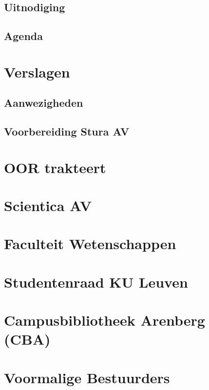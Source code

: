 \documentclass[a4paper,11pt]{article}
\begin{document}
	\subsection{Uitnodiging}
	
	\subsection{Agenda}
	
	\section{Verslagen}
	
	\subsection{Aanwezigheden}
	
	\subsection{Voorbereiding Stura AV}
	
	\section{OOR trakteert}
	
	\section{Scientica AV}
	
	\section{Faculteit Wetenschappen}
	
	\section{Studentenraad KU Leuven}
	\label{stura}
	
	\section{Campusbibliotheek Arenberg (CBA)}
	
	\section{Voormalige Bestuurders}
	
	
\end{document}
